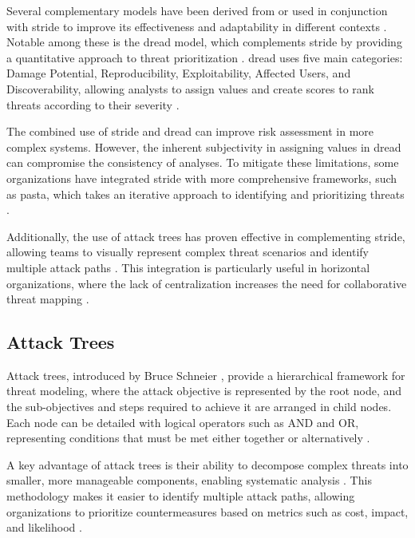 Several complementary models have been derived from or used in conjunction with
\gls{stride} to improve its effectiveness and adaptability in different contexts
\cite{SoftwareandattackcentricThreatModeling}. Notable among these is the
\gls{dread} model, which complements \gls{stride} by providing a quantitative
approach to threat prioritization \cite{DREADful}. \gls{dread} uses five main
categories: Damage Potential, Reproducibility, Exploitability, Affected Users,
and Discoverability, allowing analysts to assign values and create scores to
rank threats according to their severity
\cite{SoftwareandattackcentricThreatModeling, DREADful}.

The combined use of \gls{stride} and \gls{dread} can improve risk assessment in
more complex systems. However, the inherent subjectivity in assigning values
in \gls{dread} can compromise the consistency of \cite{DREADful} analyses. To
mitigate these limitations, some organizations have integrated \gls{stride} with
more comprehensive frameworks, such as \gls{pasta}, which takes an iterative
approach to identifying and prioritizing threats
\cite{SoftwareandattackcentricThreatModeling}.

Additionally, the use of attack trees has proven effective in complementing
\gls{stride}, allowing teams to visually represent complex threat scenarios and
identify multiple attack paths \cite{FoundationsofAttackTrees}. This integration
is particularly useful in horizontal organizations, where the lack of
centralization increases the need for collaborative threat mapping
\cite{ThreatModelingdesigningForSecurity}.

\subsection{Attack Trees}
\label{subsec:attack_trees}

Attack trees, introduced by Bruce Schneier \cite{AttackTrees}, provide a
hierarchical framework for threat modeling, where the attack objective is
represented by the root node, and the sub-objectives and steps required to
achieve it are arranged in child nodes. Each node can be detailed with logical
operators such as AND and OR, representing conditions that must be met either
together or alternatively \cite{FoundationsofAttackTrees}.

A key advantage of attack trees is their ability to decompose complex threats
into smaller, more manageable components, enabling systematic analysis
\cite{Energytheftdetectionissues}. This methodology makes it easier to identify
multiple attack paths, allowing organizations to prioritize countermeasures
based on metrics such as cost, impact, and likelihood
\cite{AnAttackTreeBasedRisk}.

